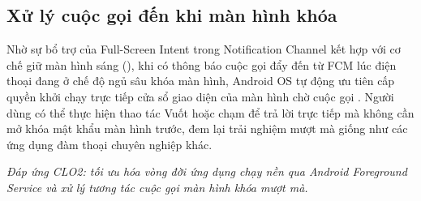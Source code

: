 \subsection{Xử lý cuộc gọi đến khi màn hình khóa}
Nhờ sự bổ trợ của Full-Screen Intent trong Notification Channel kết hợp với cơ chế giữ màn hình sáng (), khi có thông báo cuộc gọi đẩy đến từ FCM lúc điện thoại đang ở chế độ ngủ sâu khóa màn hình, Android OS tự động ưu tiên cấp quyền khởi chạy trực tiếp cửa sổ giao diện của màn hình chờ cuộc gọi . Người dùng có thể thực hiện thao tác Vuốt hoặc chạm để trả lời trực tiếp mà không cần mở khóa mật khẩu màn hình trước, đem lại trải nghiệm mượt mà giống như các ứng dụng đàm thoại chuyên nghiệp khác.

\textit{Đáp ứng CLO2: tối ưu hóa vòng đời ứng dụng chạy nền qua Android Foreground Service và xử lý tương tác cuộc gọi màn hình khóa mượt mà.}
